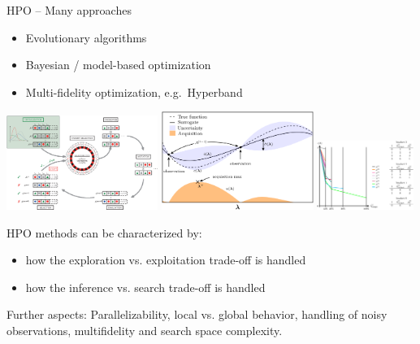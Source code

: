 \begin{vbframe}{HPO -- Many approaches}
\begin{itemize}
    \item Evolutionary algorithms
    \item Bayesian / model-based optimization
    \item Multi-fidelity optimization, e.g.\ Hyperband
\end{itemize}

\includegraphics[width = 0.37\textwidth]{figure/ea.eps}
\includegraphics[width = 0.37\textwidth]{figure/mbo.png}
\includegraphics[trim=0 0 285 0, clip, width = 0.235\textwidth]{figure/hyperband.png}

HPO methods can be characterized by: 
\begin{itemize}
    \item how the exploration vs. exploitation trade-off is handled
    \item how the inference vs. search trade-off is handled%
\end{itemize}

Further aspects: Parallelizability, local vs. global behavior, handling of noisy observations, multifidelity and search space complexity. 

\end{vbframe}

